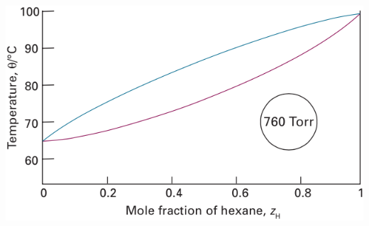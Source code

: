 \documentclass[a4paper,12pt]{article}
\begin{document}
\begin{enumerate}
\begin{center}
 \includegraphics[scale=0.46]{figure3}
\end{center} %

\end{enumerate}
\end{document}
